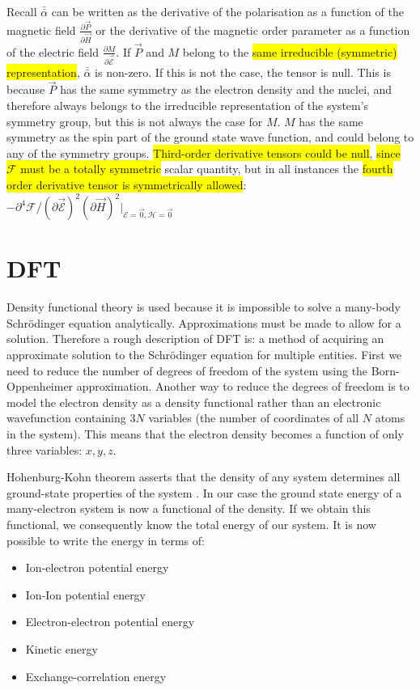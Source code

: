 \documentclass[10pt]{article}
\newcommand{\hilight}[1]{\colorbox{yellow}{#1}}
\begin{document}
Recall $\bar\bar{\alpha}$ can be written as the derivative of the polarisation as a function of the magnetic field $\frac{\partial\vec{P}}{\partial\vec{H}}$ or the derivative of the magnetic order parameter as a function of the electric field $\frac{\partial M}{\partial\vec{\mathcal{E}}}$. If $\vec{P}$ and $M$ belong to the \hilight{same irreducible (symmetric) representation}, $\bar{\bar{\alpha}}$ is non-zero. If this is not the case, the tensor is null. This is because $\vec{P}$ has the same symmetry as the electron density and the nuclei, and therefore always belongs to the irreducible representation of the system's symmetry group, but this is not always the case for $M$. $M$ has the same symmetry as the spin part of the ground state wave function, and could belong to any of the symmetry groups. \hilight{Third-order derivative tensors could be null}, \hilight{since $\mathcal{F}$ must be a totally symmetric} scalar quantity, but in all instances the \hilight{fourth order derivative tensor is symmetrically allowed}: $-\partial^4\mathcal{F}/(\partial\vec{\mathcal{E}})^2(\partial\vec{H})^2\biggr\vert_{\mathcal{E}=\vec{0}, \mathcal{H}=\vec{0}}$

\section{DFT}
Density functional theory is used because it is impossible to solve a many-body Schrödinger equation analytically. Approximations must be made to allow for a solution. Therefore a rough description of DFT is: a method of acquiring an approximate solution to the Schrödinger equation for multiple entities. First we need to reduce the number of degrees of freedom of the system using the Born-Oppenheimer approximation. Another way to reduce the degrees of freedom is to model the electron density as a density functional rather than an electronic wavefunction containing $3N$ variables (the number of coordinates of all $N$ atoms in the system). This means that the electron density becomes a function of only three variables: $x,y,z$.

Hohenburg-Kohn theorem asserts that the density of any system determines all ground-state properties of the system \cite{hohenberg1964density}. In our case the ground state energy of a many-electron system is now a functional of the density. If we obtain this functional, we consequently know the total energy of our system. It is now possible to write the energy in terms of:

\begin{itemize}
	\item Ion-electron potential energy
	\item Ion-Ion potential energy
	\item Electron-electron potential energy
	\item Kinetic energy
	\item Exchange-correlation energy
\end{itemize}
\end{document}
